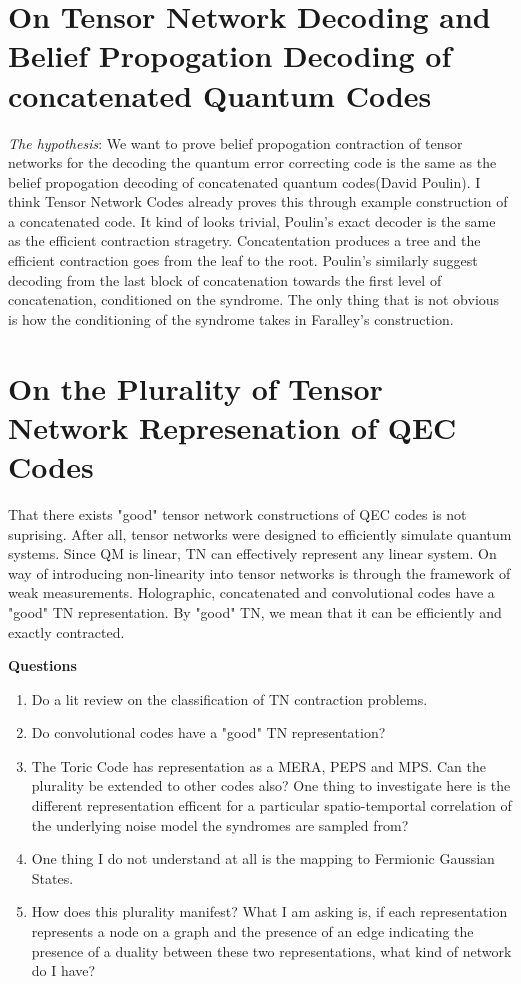 \documentclass[%
 reprint,
amsmath,amssymb,
aps,
onecolumn,
]{revtex4-2}
\begin{document}
\section{On Tensor Network Decoding and Belief Propogation Decoding of concatenated Quantum Codes}
\textit{The hypothesis}: We want to prove belief propogation contraction of tensor networks for the decoding the quantum error correcting code is the same as the belief propogation decoding of concatenated quantum codes(David Poulin). I think Tensor Network Codes already proves this through example construction of a concatenated code. It kind of looks trivial, Poulin's exact decoder is the same as the efficient contraction stragetry. Concatentation produces a tree and the efficient contraction goes from the leaf to the root. Poulin's similarly suggest decoding from the last block of concatenation towards the first level of concatenation, conditioned on the syndrome. The only thing that is not obvious is how the conditioning of the syndrome takes in Faralley's construction.



\section{On the Plurality of Tensor Network Represenation of QEC Codes}
That there exists "good" tensor network constructions of QEC codes is not suprising. After all, tensor networks were designed to efficiently simulate quantum systems. Since QM is linear, TN can effectively represent any linear system. On way of introducing non-linearity into tensor networks is through the framework of weak measurements. Holographic, concatenated and convolutional codes have a "good" TN representation. By "good" TN, we mean that it can be efficiently and exactly contracted. 

\textbf{Questions}
\begin{enumerate}
    \item Do a lit review on the classification of TN contraction problems. 
    \item Do convolutional codes have a "good" TN representation?
    \item The Toric Code has representation as a MERA, PEPS and MPS. Can the plurality be extended to other codes also? One thing to investigate here is the different representation efficent for a particular spatio-temportal correlation of the underlying noise model the syndromes are sampled from?
    \item One thing I do not understand at all is the mapping to Fermionic Gaussian States. 
    \item How does this plurality manifest? What I am asking is, if each representation represents a node on a graph and the presence of an edge indicating the presence of a duality between these two representations, what kind of network do I have?
\end{enumerate}
\end{document}
